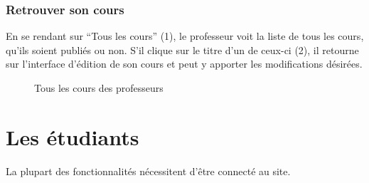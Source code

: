 \documentclass[letterpaper,10pt,oneside]{sphinxmanual}
\begin{document}
\subsubsection{Retrouver son cours}
\label{functionalities:retrouver-son-cours}
En se rendant sur ``Tous les cours'' (1), le professeur voit la liste de tous les cours, qu'ils soient publiés ou non. S'il clique sur le titre d'un de ceux-ci (2), il retourne sur l'interface d'édition de son cours et peut y apporter les modifications désirées.
\begin{figure}[htbp]
\centering
\capstart

\caption{Tous les cours des professeurs}\end{figure}


\section{Les étudiants}
\label{functionalities:les-etudiants}
La plupart des fonctionnalités nécessitent d'être connecté au site.
\end{document}
